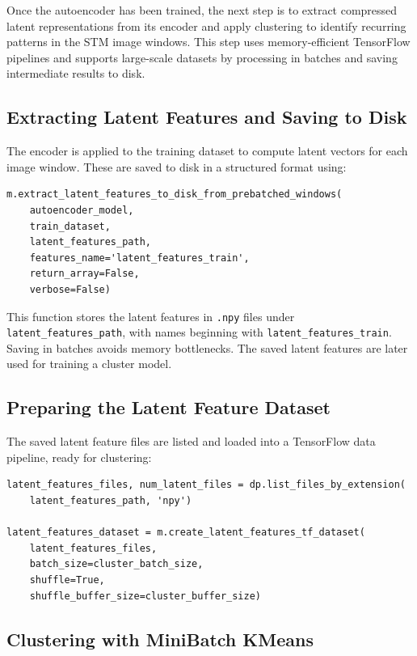 \documentclass[11pt]{article}
\begin{document}
Once the autoencoder has been trained, the next step is to extract compressed latent representations from its encoder and apply clustering to identify recurring patterns in the STM image windows. This step uses memory-efficient TensorFlow pipelines and supports large-scale datasets by processing in batches and saving intermediate results to disk.

\subsection*{Extracting Latent Features and Saving to Disk}

The encoder is applied to the training dataset to compute latent vectors for each image window. These are saved to disk in a structured format using:

\begin{verbatim}
m.extract_latent_features_to_disk_from_prebatched_windows(
    autoencoder_model, 
    train_dataset, 
    latent_features_path, 
    features_name='latent_features_train',
    return_array=False,
    verbose=False)
\end{verbatim}

This function stores the latent features in \texttt{.npy} files under \texttt{latent\_features\_path}, with names beginning with \texttt{latent\_features\_train}. Saving in batches avoids memory bottlenecks. The saved latent features are later used for training a cluster model.

\subsection*{Preparing the Latent Feature Dataset}

The saved latent feature files are listed and loaded into a TensorFlow data pipeline, ready for clustering:

\begin{verbatim}
latent_features_files, num_latent_files = dp.list_files_by_extension(
    latent_features_path, 'npy')

latent_features_dataset = m.create_latent_features_tf_dataset(
    latent_features_files,
    batch_size=cluster_batch_size,
    shuffle=True, 
    shuffle_buffer_size=cluster_buffer_size)
\end{verbatim}

\subsection*{Clustering with MiniBatch KMeans}
\end{document}

